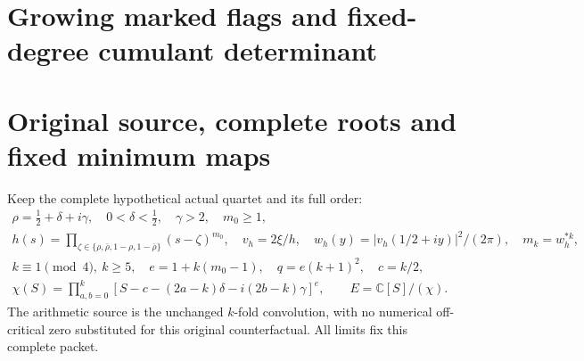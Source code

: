 \documentclass[11pt,a4paper]{article}
\begin{document}
\endgroup

\clearpage
\begingroup
\def\C{\mathbb C}
\def\R{\mathbb R}
\def\PP{\mathcal P}
\def\Fcal{\mathscr F}
\def\Bcal{\mathcal B}
\def\norm#1{\left\lVert#1\right\rVert}
\def\Tr{\operatorname{Tr}}
\def\im{\operatorname{im}}
\def\Gram{\operatorname{Gram}}
\def\cond{\operatorname{cond}}

\setcounter{equation}{0}
\renewcommand{\theequation}{A02GMF.\arabic{equation}}
\section*{Growing marked flags and fixed-degree cumulant determinant}



\begin{abstract}
For the original arithmetic source and its specified centre-filled
comparison, a linearly growing marked flag has large positive
individual logarithmic volume changes at every original cutoff.
Its balanced four-cutoff return nevertheless has an explicit
exponentially small bound.  The proof estimates every admissible
relation and terminal representative before taking the original
minima; it retains the full terminal--polynomial cross block.
The same estimates give linearly many large generalized
eigenvalues and a complementary subspace forcing all but
\(O_h(q/\log(q/k))\) eigenvalues into an exponentially short
interval about one.  Exact quotient determinant factorization
then carries the complete signed central response into the
attained complement of the marked flag.  The stated complement
is retained as its actual metric quotient.
\end{abstract}

\section{Original source, complete roots and fixed minimum maps}

Keep the complete hypothetical actual quartet and its full order:
\begin{equation}\tag{GMF1}
\begin{gathered}
 \rho=\tfrac12+\delta+i\gamma,\quad
 0<\delta<\tfrac12,\quad \gamma>2,\quad m_0\ge1,\\
 h(s)=\prod_{\zeta\in\{\rho,\bar\rho,1-\rho,1-\bar\rho\}}
                       (s-\zeta)^{m_0},\quad
 v_h=2\xi/h,\quad
 w_h(y)=|v_h(1/2+iy)|^2/(2\pi),\quad m_k=w_h^{*k},\\
 k\equiv1\pmod4,\ k\ge5,\quad
 e=1+k(m_0-1),\quad q=e(k+1)^2,\quad c=k/2,\\
 \chi(S)=\prod_{a,b=0}^k
 [S-c-(2a-k)\delta-i(2b-k)\gamma]^e,\qquad
 E=\C[S]/(\chi).
\end{gathered}
\end{equation}
The arithmetic source is the unchanged \(k\)-fold convolution,
with no numerical off-critical zero substituted for this original
counterfactual.  All limits fix this complete packet.
\end{document}

